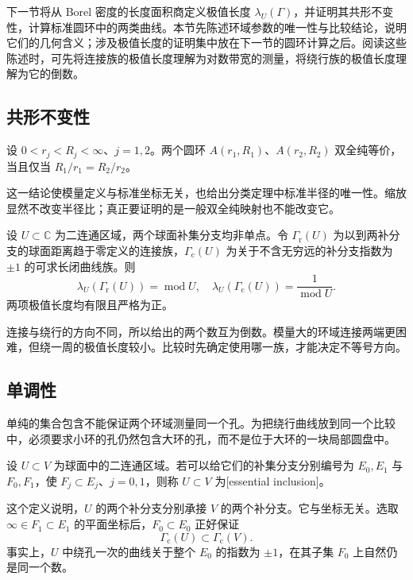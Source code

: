 \ProseParagraphBreak
下一节将从 Borel 密度的长度面积商定义极值长度 \(\lambda_U(\Gamma)\)，并证明其共形不变性，计算标准圆环中的两类曲线。本节先陈述环域参数的唯一性与比较结论，说明它们的几何含义；涉及极值长度的证明集中放在下一节的圆环计算之后。阅读这些陈述时，可先将连接族的极值长度理解为对数带宽的测量，将绕行族的极值长度理解为它的倒数。

\subsection{共形不变性}
\label{b3:subsec:080202}

\begin{proposition}\label{b3:prop:08-modulus-invariance}
设 \(0<r_j<R_j<\infty\)、\(j=1,2\)。两个圆环 \(A(r_1,R_1)\)、\(A(r_2,R_2)\) 双全纯等价，当且仅当 \(R_1/r_1=R_2/r_2\)。
\end{proposition}

这一结论使模量定义与标准坐标无关，也给出分类定理中标准半径的唯一性。缩放显然不改变半径比；真正要证明的是一般双全纯映射也不能改变它。

\begin{proposition}\label{b3:prop:08-modulus-families}
设 \(U\subset\mathbb C\) 为二连通区域，两个球面补集分支均非单点。令 \(\Gamma_{\mathrm r}(U)\) 为以到两补分支的球面距离趋于零定义的连接族，\(\Gamma_{\mathrm c}(U)\) 为关于不含无穷远的补分支指数为 \(\pm1\) 的可求长闭曲线族。则
\[
 \lambda_U(\Gamma_{\mathrm r}(U))=\operatorname{mod}U,
 \quad
 \lambda_U(\Gamma_{\mathrm c}(U))=\frac1{\operatorname{mod}U}.
\]
两项极值长度均有限且严格为正。
\end{proposition}

连接与绕行的方向不同，所以给出的两个数互为倒数。模量大的环域连接两端更困难，但绕一周的极值长度较小。比较时先确定使用哪一族，才能决定不等号方向。

\subsection{单调性}
\label{b3:subsec:080203}

单纯的集合包含不能保证两个环域测量同一个孔。为把绕行曲线放到同一个比较中，必须要求小环的孔仍然包含大环的孔，而不是位于大环的一块局部圆盘中。

\begin{definition}\label{b3:def:08-essential-inclusion}
设 \(U\subset V\) 为球面中的二连通区域。若可以给它们的补集分支分别编号为 \(E_0,E_1\) 与 \(F_0,F_1\)，使 \(F_j\subset E_j\)、\(j=0,1\)，则称 \(U\subset V\) 为[essential inclusion]。
\end{definition}
这个定义说明，\(U\) 的两个补分支分别承接 \(V\) 的两个补分支。它与坐标无关。选取 \(\infty\in F_1\subset E_1\) 的平面坐标后，\(F_0\subset E_0\) 正好保证
\[
 \Gamma_{\mathrm c}(U)\subset\Gamma_{\mathrm c}(V).
\]
事实上，\(U\) 中绕孔一次的曲线关于整个 \(E_0\) 的指数为 \(\pm1\)，在其子集 \(F_0\) 上自然仍是同一个数。

